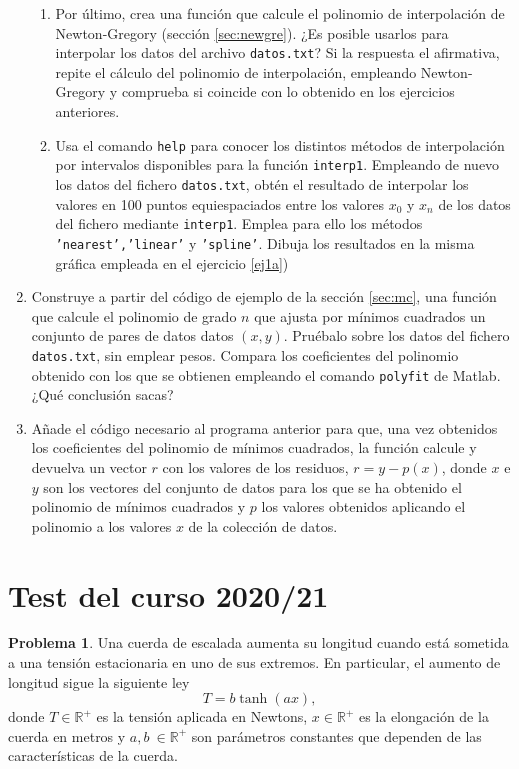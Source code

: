 \begin{enumerate}
\begin{enumerate}
\item Por último, crea una función que calcule el polinomio de interpolación de Newton-Gregory (sección \ref{sec:newgre}). ¿Es posible usarlos para interpolar los datos del archivo \texttt{datos.txt}? Si la respuesta el afirmativa, repite el cálculo del polinomio de interpolación, empleando Newton-Gregory y comprueba si coincide con lo obtenido en los ejercicios anteriores.

\item Usa el comando \texttt{help} para conocer los distintos métodos de interpolación por intervalos disponibles  para la función \texttt{interp1}. Empleando de nuevo los datos del fichero \texttt{datos.txt}, obtén el resultado de interpolar los valores en 100 puntos equiespaciados entre los valores $x_0$ y $x_{n}$ de los datos del fichero mediante \texttt{interp1}.  Emplea para ello los métodos \texttt{'nearest','linear'} y \texttt{'spline'}. Dibuja los resultados en la misma gráfica empleada en el ejercicio  \ref{ej1a})
\end{enumerate}
\item Construye a partir del código de ejemplo de la sección \ref{sec:mc}, una función que calcule el polinomio de grado $n$ que ajusta por mínimos cuadrados un conjunto de pares de datos datos $(x, y)$. Pruébalo sobre los datos del fichero \texttt{datos.txt}, sin emplear pesos. Compara los coeficientes del polinomio obtenido con los que se obtienen empleando el comando \texttt{polyfit} de Matlab. ¿Qué conclusión sacas?

\item Añade el código necesario al programa anterior para que, una vez obtenidos los coeficientes del polinomio de mínimos cuadrados, la función calcule y devuelva un vector $r$ con los valores de los residuos, $r = y -p(x)$, donde $x$ e $y$ son los vectores del conjunto de datos para los que se ha obtenido el polinomio de mínimos cuadrados y $p$ los valores obtenidos aplicando el polinomio a los valores $x$ de la colección de datos.
\end{enumerate}


\section{Test del curso 2020/21}


\noindent \textbf{Problema 1}. Una cuerda de escalada aumenta su longitud cuando está sometida a una tensión estacionaria en uno de sus extremos. En particular, el aumento de longitud sigue la siguiente ley
\begin{equation}\label{eq:0}
T = b\tanh(ax),
\end{equation}
donde $T \in \mathbb{R}^+$ es la tensión aplicada en Newtons, $x \in \mathbb{R}^+$ es la elongación de la cuerda en metros y $a, b \ \in \mathbb{R}^+$ son parámetros constantes que dependen de las características de la cuerda.

